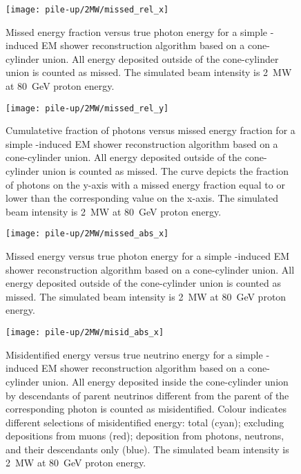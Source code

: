 \begin{figure}[htb]
	\centering
	\texttt{[image: pile-up/2MW/missed\_rel\_x]}
	\caption{Missed energy fraction versus true photon energy for a simple \Pgpz-induced EM shower reconstruction algorithm based on a cone-cylinder union.
		All energy deposited outside of the cone-cylinder union is counted as missed.
		The simulated beam intensity is \SI{2}{\mega\watt} at \SI{80}{\giga\electronvolt} proton energy.}
	\label{fig:dune-nd_2MW_missed-rel-x}
\end{figure}

\begin{figure}[htb]
	\centering
	\texttt{[image: pile-up/2MW/missed\_rel\_y]}
	\caption{Cumulatetive fraction of photons versus missed energy fraction for a simple \Pgpz-induced EM shower reconstruction algorithm based on a cone-cylinder union.
		All energy deposited outside of the cone-cylinder union is counted as missed.
		The curve depicts the fraction of photons on the y-axis with a missed energy fraction equal to or lower than the corresponding value on the x-axis.
		The simulated beam intensity is \SI{2}{\mega\watt} at \SI{80}{\giga\electronvolt} proton energy.}
	\label{fig:dune-nd_2MW_missed-rel-y}
\end{figure}

\begin{figure}[htb]
	\centering
	\texttt{[image: pile-up/2MW/missed\_abs\_x]}
	\caption{Missed energy versus true photon energy for a simple \Pgpz-induced EM shower reconstruction algorithm based on a cone-cylinder union.
		All energy deposited outside of the cone-cylinder union is counted as missed.
		The simulated beam intensity is \SI{2}{\mega\watt} at \SI{80}{\giga\electronvolt} proton energy.}
	\label{fig:dune-nd_2MW_missed-abs-x}
\end{figure}

\begin{figure}[htb]
	\centering
	\texttt{[image: pile-up/2MW/misid\_abs\_x]}
	\caption{Misidentified energy versus true neutrino energy for a simple \Pgpz-induced EM shower reconstruction algorithm based on a cone-cylinder union.
		All energy deposited inside the cone-cylinder union by descendants of parent neutrinos different from the parent of the corresponding \Pgpz photon is counted as misidentified.
		Colour indicates different selections of misidentified energy: total (cyan); excluding depositions from muons (red); deposition from photons, neutrons, and their descendants only (blue).
		The simulated beam intensity is \SI{2}{\mega\watt} at \SI{80}{\giga\electronvolt} proton energy.}
	\label{fig:dune-nd_2MW_misid-abs-x}
\end{figure}

